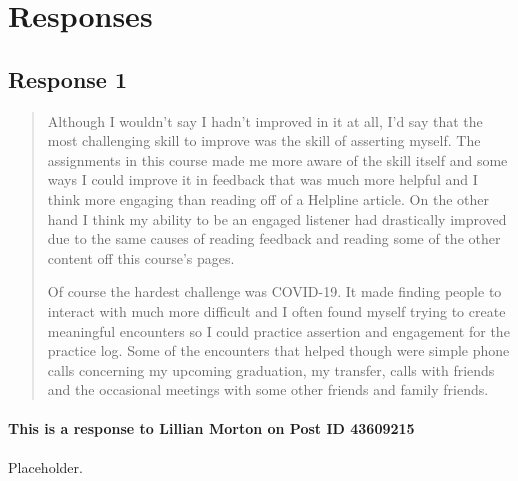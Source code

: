 
\section{Responses}
  \subsection{Response 1}
    \begin{quotation}
      Although I wouldn’t say I hadn’t improved in it at all, I’d say that the
        most challenging skill to improve was the skill of asserting myself.
        The assignments in this course made me more aware of the skill itself
        and some ways I could improve it in feedback that was much more helpful
        and I think more engaging than reading off of a Helpline article. On the
        other hand I think my ability to be an engaged listener had drastically
        improved due to the same causes of reading feedback and reading some of
        the other content off this course’s pages.

      Of course the hardest challenge was COVID-19. It made finding people to
        interact with much more difficult and I often found myself trying to
        create meaningful encounters so I could practice assertion and
        engagement for the practice log. Some of the encounters that helped
        though were simple phone calls concerning my upcoming graduation, my
        transfer, calls with friends and the occasional meetings with some other
        friends and family friends.
    \end{quotation}

    \paragraph{This is a response to Lillian Morton on Post ID 43609215}
      Placeholder.
